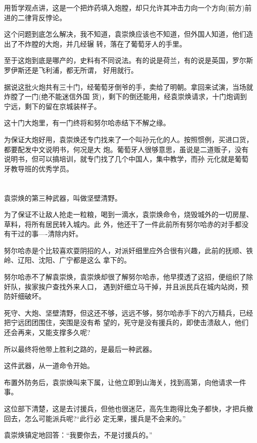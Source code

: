 \documentclass[11pt,a4paper,onecolumn]{article}
\begin{document}
用哲学观点讲，这是一个把炸药填入炮膛，却只允许其冲击力向一个方向(前方)前进的二律背反悖论。

这个问题到底怎么解决，我不知道，袁崇焕应该也不知道，但外国人知道，他们造出了不炸膛的大炮，并几经辗
转，落在了葡萄牙人的手里。

至于这炮到底是哪产的，史料有不同说法。有的说是荷兰，有的说是英国，罗尔斯罗伊斯还是飞利浦，都无所谓，
好用就行。

据说这批火炮共有三十门，经葡萄牙倒爷的手，卖给了明朝。拿回来试演，当场就炸膛了一门(绝不能迷信外国
货)，剩下的倒还能用，经袁崇焕请求，十门炮调到宁远，剩下的留在京城装样子。

这十门大炮里，有一门终将和努尔哈赤结下不解之缘。

为保证大炮好用，袁崇焕还专门找来了一个叫孙元化的人。按照惯例，买进口货，都要配发中文说明书，何况是大
炮。葡萄牙人很够意思，虽说是二道贩子，没有说明书，但可以搞培训，就专门找了几个中国人，集中教学，而孙
元化就是葡萄牙教导班的优秀学员。

\section[\thesection]{}

袁崇焕的第三种武器，叫做坚壁清野。

为了保证不让敌人抢走一粒粮，喝到一滴水，袁崇焕命令，烧毁城外的一切房屋、草料，将所有居民转入城内。此
外，他还干了一件此前所有努尔哈赤的对手都没有干过的事----清除内奸。

努尔哈赤是个比较喜欢耍阴招的人，对派奸细里应外合很有兴趣，此前的抚顺、铁岭、辽阳、沈阳、广宁都是这么
拿下的。

努尔哈赤不了解袁崇焕，袁崇焕却很了解努尔哈赤，他早摸透了这招，便组织了除奸队，挨家挨户查找外来人口，
遇到奸细立马干掉，并且派民兵在城内站岗，预防奸细破坏。

死守、大炮、坚壁清野，但这还不够，远远不够，努尔哈赤手下的六万精兵，已经把宁远团团围住，突围是没有希
望的，死守是没有援兵的，即使击溃敌人，他们还会再来，又能支撑多久呢?

所以最终将他带上胜利之路的，是最后一种武器。

这件武器，从一道命令开始。

布置外防务后，袁崇焕叫来下属，让他立即到山海关，找到高第，向他请求一件事。

这位部下清楚，这是去讨援兵，但他也很迷茫，高先生跑得比兔子都快，才把兵撤回去，怎么可能派兵呢?``此行必
定无果，援兵是不会来的。''

袁崇焕镇定地回答：``我要你去，不是讨援兵的。''
\end{document}
